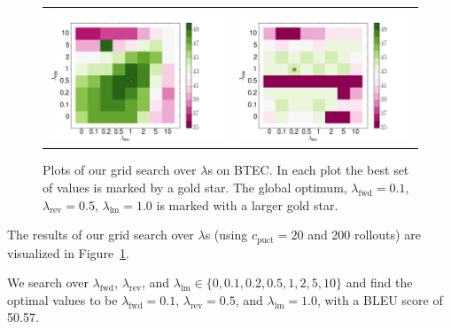\documentclass[11pt,a4paper]{article}
\begin{document}
\begin{figure}
\begin{tabular}{c c}
\includegraphics[scale=0.36]{0_5.png} & \includegraphics[scale=0.36]{10.png} \\
\end{tabular}
\caption{Plots of our grid search over $\lambda$s on BTEC. In each plot the best set of values is marked by a gold star.
The global optimum, $\lambda_\text{fwd}=0.1$, $\lambda_\text{rev}=0.5$, $\lambda_\text{lm}=1.0$ is marked with a larger gold star.}
\label{fig:grid_search}
\end{figure}

The results of our grid search over $\lambda$s (using $c_\text{puct}=20$ and
200 rollouts) are visualized in Figure~\ref{fig:grid_search}.

We search over $\lambda_{\text{fwd}}$, $\lambda_{\text{rev}}$, and
$\lambda_{\text{lm}} \in \{0, 0.1, 0.2, 0.5, 1, 2, 5, 10\}$ and find the
optimal values to be $\lambda_\text{fwd}=0.1$, $\lambda_\text{rev}=0.5$, and
$\lambda_\text{lm}=1.0$, with a BLEU score of 50.57.
\end{document}
